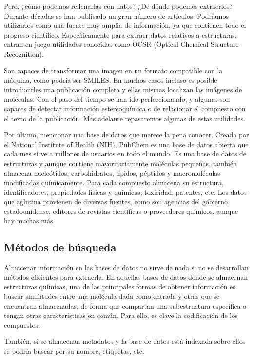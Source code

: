 Pero, ¿cómo podemos rellenarlas con datos? ¿De dónde podemos extraerlos? Durante décadas se han publicado un gran número de artículos. Podríamos utilizarlos como una fuente muy amplia de información, ya que contienen todo el progreso científico. Específicamente para extraer datos relativos a estructuras, entran en juego utilidades conocidas como OCSR (Optical Chemical Structure Recognition).

Son capaces de transformar una imagen en un formato compatible con la máquina, como podría ser SMILES. En muchos casos incluso es posible introducirles una publicación completa y ellas mismas localizan las imágenes de moléculas. Con el paso del tiempo se han ido perfeccionando, y algunas son capaces de detectar información estereoquímica o de relacionar el compuesto con el texto de la publicación. Más adelante repasaremos algunas de estas utilidades. 

Por último, mencionar una base de datos que merece la pena conocer. Creada por el National Institute of Health (NIH), PubChem es una base de datos abierta que cada mes sirve a millones de usuarios en todo el mundo. Es una base de datos de estructuras y aunque contiene mayoritariamente moléculas pequeñas, también almacena nucleótidos, carbohidratos, lípidos, péptidos y macromoléculas modificadas químicamente. Para cada compuesto almacena su estructura, identificadores, propiedades físicas y químicas, toxicidad, patentes, etc. Los datos que aglutina provienen de diversas fuentes, como son agencias del gobierno estadounidense, editores de revistas científicas o proveedores químicos, aunque hay muchas más. \cite{pubchem}

\subsection*{Métodos de búsqueda}
Almacenar información en las bases de datos no sirve de nada si no se desarrollan métodos eficientes para extraerla. En aquellas bases de datos donde se almacenan estructuras químicas, una de las principales formas de obtener información es buscar similitudes entre una molécula dada como entrada y otras que se encuentran almacenadas, de forma que compartan una subestructura específica o tengan otras características en común. Para ello, es clave la codificación de los compuestos.

También, si se almacenan metadatos y la base de datos está indexada sobre ellos se podría buscar por su nombre, etiquetas, etc. \cite{doi:10.1021/ci600234z}

